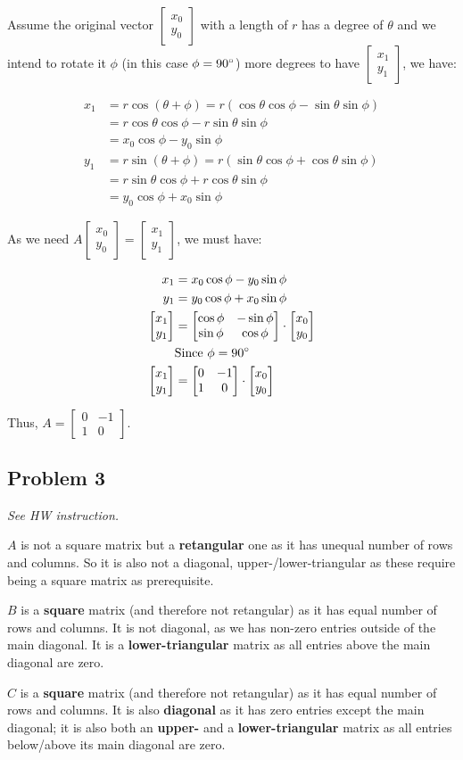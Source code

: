 \documentclass[11pt]{article}
\providecommand{\qbm}[1]{\begin{bmatrix} #1 \end{bmatrix}}
\begin{document}
Assume the original vector $\qbm{x_0 \\ y_0}$ with a length of $r$ has a degree of $\theta$ and we intend to rotate it $\phi$ (in this case $\phi = 90\degree$) more degrees to have $\qbm{x_1 \\ y_1}$, we have:

\begin{align*}
    x_1 &= r \cos(\theta + \phi) = r(\cos \theta \cos \phi - \sin \theta \sin \phi) \\
    &= r \cos \theta \cos \phi - r \sin \theta \sin \phi \\
    &= x_0 \cos \phi - y_0 \sin \phi \\
    y_1 &= r \sin(\theta + \phi) = r(\sin \theta \cos \phi + \cos \theta \sin \phi) \\
    &= r\sin \theta \cos \phi + r\cos \theta \sin \phi \\
    &= y_0 \cos \phi + x_0 \sin \phi
\end{align*}

As we need $A \qbm{x_0 \\ y_0} = \qbm{x_1 \\ y_1}$, we must have:

\begin{align*}
    x_1 &= x_0 \cos \phi - y_0 \sin \phi \\
    y_1 &= y_0 \cos \phi + x_0 \sin \phi \\
    \qbm{x_1 \\ y_1} &= \qbm{\cos \phi & -\sin \phi \\ \sin \phi & \cos \phi} \cdot \qbm{x_0 \\ y_0} \\
    &\text{Since}\ \phi = 90\degree \\
    \qbm{x_1 \\ y_1} &= \qbm{0 & -1 \\ 1 & 0} \cdot \qbm{x_0 \\ y_0}
\end{align*}

Thus, $A = \qbm{0 & -1 \\ 1 & 0}$.

\subsection*{Problem 3}
\textit{See HW instruction.}\newline

$A$ is not a square matrix but a \textbf{retangular} one as it has unequal number of rows and columns. So it is also not a diagonal, upper-/lower-triangular as these require being a square matrix as prerequisite.

$B$ is a \textbf{square} matrix (and therefore not retangular) as it has equal number of rows and columns. It is not diagonal, as we has non-zero entries outside of the main diagonal. It is a \textbf{lower-triangular} matrix as all entries above the main diagonal are zero.

$C$ is a \textbf{square} matrix (and therefore not retangular) as it has equal number of rows and columns. It is also \textbf{diagonal} as it has zero entries except the main diagonal; it is also both an \textbf{upper-} and a \textbf{lower-triangular} matrix as all entries below/above its main diagonal are zero.
\end{document}
